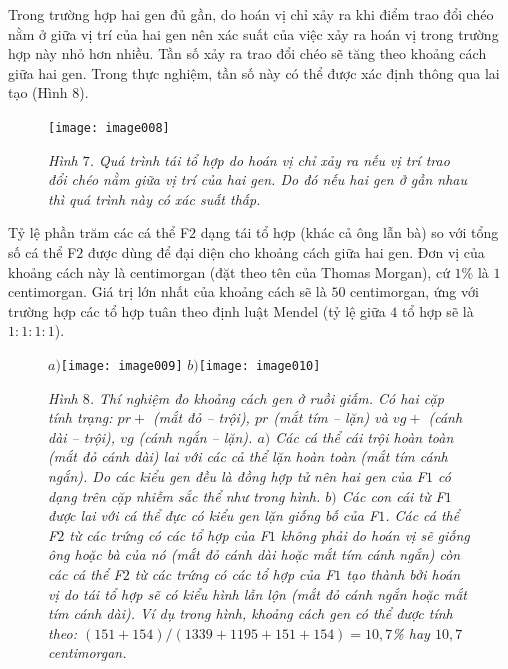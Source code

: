 \begin{multicols}{2}
\begin{figure}[H]
		\vspace*{-10pt}
	\end{figure}
	Trong trường hợp hai gen đủ gần, do hoán vị chỉ xảy ra khi điểm trao đổi chéo nằm ở giữa vị trí của hai gen nên xác suất của việc xảy ra hoán vị trong trường hợp này nhỏ hơn nhiều. Tần số xảy ra trao đổi chéo sẽ tăng theo khoảng cách giữa hai gen. Trong thực nghiệm, tần số này có thể được xác định thông qua lai tạo (Hình $8$).
	\begin{figure}[H]
		\centering
		\vspace*{-5pt}
		\captionsetup{labelformat= empty, justification=centering}
		\texttt{[image: image008]}
		\caption{\small\textit{\color{timhieukhoahoc}Hình $7$. Quá trình tái tổ hợp do hoán vị chỉ xảy ra nếu vị trí trao đổi chéo nằm giữa vị trí của hai gen. Do đó nếu hai gen ở gần nhau thì quá trình này có xác suất thấp.}}
		\vspace*{-10pt}
	\end{figure}
	Tỷ lệ phần trăm các cá thể F$2$ dạng tái tổ hợp (khác cả ông lẫn bà) so với tổng số cá thể F$2$ được dùng để đại diện cho khoảng cách giữa hai gen. Đơn vị của khoảng cách này là centimorgan (đặt theo tên của Thomas Morgan), cứ $1\%$ là $1$ centimorgan. Giá trị lớn nhất của khoảng cách sẽ là $50$ centimorgan, ứng với trường hợp các tổ hợp tuân theo định luật Mendel (tỷ lệ giữa $4$ tổ hợp sẽ là $1 : 1 : 1 : 1$).
	\begin{figure}[H]
		\centering
		\captionsetup{labelformat= empty, justification=centering}
		$a)$\texttt{[image: image009]}
		$b)$\texttt{[image: image010]}
		\caption{\small\textit{\color{timhieukhoahoc}Hình $8$. Thí nghiệm đo khoảng cách gen ở ruồi giấm. Có hai cặp tính trạng: $pr+$ (mắt đỏ -- trội), $pr$ (mắt tím -- lặn) và $vg+$ (cánh dài -- trội), $vg$ (cánh ngắn -- lặn). $a)$ Các cá thể cái trội hoàn toàn (mắt đỏ cánh dài) lai với các cả thể lặn hoàn toàn (mắt tím cánh ngắn). Do các kiểu gen đều là đồng hợp tử nên hai gen của F$1$ có dạng trên cặp nhiễm sắc thể như trong hình. $b)$ Các con cái từ F$1$ được lai với cá thể đực có kiểu gen lặn giống bố của F$1$. Các cá thể F$2$ từ các trứng có các tổ hợp của F$1$ không phải do hoán vị sẽ giống ông hoặc bà của nó (mắt đỏ cánh dài hoặc mắt tím cánh ngắn) còn các cá thể F$2$ từ các trứng có các tổ hợp của F$1$ tạo thành bởi hoán vị do tái tổ hợp sẽ có kiểu hình lẫn lộn (mắt đỏ cánh ngắn hoặc mắt tím cánh dài). Ví dụ trong hình, khoảng cách gen có thể được tính theo: $(151 + 154)/(1339 + 1195 + 151 +154) = 10,7$\% hay $10,7$ centimorgan.}}

\end{figure}
\end{multicols}
